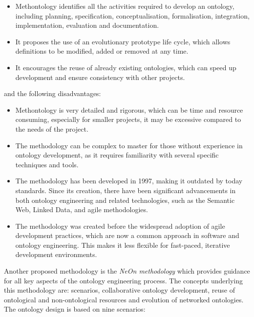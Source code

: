 \begin{itemize}
    \item Methontology identifies all the activities required to develop an ontology, including planning, specification, conceptualisation, formalisation, integration, implementation, evaluation and documentation. 

    \item It proposes the use of an evolutionary prototype life cycle, which allows definitions to be modified, added or removed at any time.

    \item It encourages the reuse of already existing ontologies, which can speed up development and ensure consistency with other projects. 
\end{itemize}
and the following disadvantages:
\begin{itemize}
    \item Methontology is very detailed and rigorous, which can be time and resource consuming, especially for smaller projects, it may be excessive compared to the needs of the project.

    \item The methodology can be complex to master for those without experience in ontology development, as it requires familiarity with several specific techniques and tools.

    \item The methodology has been developed in 1997, making it outdated by today standards. Since its creation, there have been significant advancements in both ontology engineering and related technologies, such as the Semantic Web, Linked Data, and agile methodologies.

    \item The methodology was created before the widespread adoption of agile development practices, which are now a common approach in software and ontology engineering. This makes it less flexible for fast-paced, iterative development environments.
\end{itemize}
Another proposed methodology is the \textit{NeOn methodology}\cite{neon1}\cite{neon2} which provides guidance for all key aspects of the ontology engineering process. The concepts underlying this methodology are: scenarios, collaborative ontology development, reuse of ontological and non-ontological resources and evolution of networked ontologies. The ontology design is based on nine scenarios:
